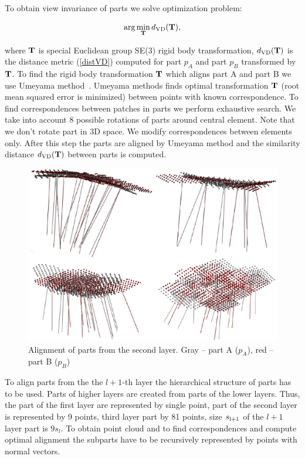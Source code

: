 \documentclass[letterpaper,10pt,conference]{ieeeconf}  %
\begin{document}
To obtain view invariance of parts we solve optimization problem:

\begin{equation}
\label{optVI}
 \arg\min_{\bf T} d_{\rm VD}({\bf T}),
\end{equation}

where ${\bf T}$ is special Euclidean group SE(3) rigid body transformation, $d_{\rm VD}({\bf T})$ is the distance metric (\ref{distVD}) computed for part $p_A$ and part $p_B$ transformed by ${\bf T}$. To find the rigid body transformation ${\bf T}$ which aligns part A and part B we use Umeyama method~\cite{Umeyama1991}. Umeyama methods finds optimal transformation ${\bf T}$ (root mean squared error is minimized) between points with known correspondence. To find correspondences between patches in parts we perform exhaustive search. We take into account 8 possible rotations of parts around central element. Note that we don't rotate part in 3D space. We modify correspondences between elements only. After this step the parts are aligned by Umeyama method and the similarity distance $d_{\rm VD}({\bf T})$ between parts is computed. 

\begin{figure}[t]
 \centering
 \includegraphics[width=0.95\columnwidth]{../images/parts2ndLayer.eps}
 \caption{Alignment of parts from the second layer. Gray -- part A ($p_A$), red -- part B ($p_B$)}
 \label{parts2ndLayer}
\end{figure}

To align parts from the the $l+1$-th layer the hierarchical structure of parts has to be used. Parts of higher layers are created from parts of the lower layers. Thus, the part of the first layer are represented by single point, part of the second layer is represented by 9 points, third layer part by 81 points, size $s_{\rm l+1}$ of the $l+1$ layer part is $9s_l$. To obtain point cloud and to find correspondences and compute optimal alignment the subparts have to be recursively represented by points with normal vectors.  
\end{document}
